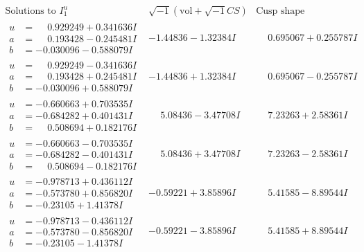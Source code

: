 \documentclass[1p]{elsarticle_modified}
\theoremstyle{definition}
\newcommand{\I}{\sqrt{-1}}
\begin{document}
$$\begin{array}{c|c|c}  
\text{Solutions to }I^u_{1}& \I (\text{vol} + \sqrt{-1}CS) & \text{Cusp shape}\\
 \hline 
\begin{aligned}
u &= \phantom{-}0.929249 + 0.341636 I \\
a &= \phantom{-}0.193428 - 0.245481 I \\
b &= -0.030096 - 0.588079 I\end{aligned}
 & -1.44836 - 1.32384 I & \phantom{-}0.695067 + 0.255787 I \\ \hline\begin{aligned}
u &= \phantom{-}0.929249 - 0.341636 I \\
a &= \phantom{-}0.193428 + 0.245481 I \\
b &= -0.030096 + 0.588079 I\end{aligned}
 & -1.44836 + 1.32384 I & \phantom{-}0.695067 - 0.255787 I \\ \hline\begin{aligned}
u &= -0.660663 + 0.703535 I \\
a &= -0.684282 + 0.401431 I \\
b &= \phantom{-}0.508694 + 0.182176 I\end{aligned}
 & \phantom{-}5.08436 - 3.47708 I & \phantom{-}7.23263 + 2.58361 I \\ \hline\begin{aligned}
u &= -0.660663 - 0.703535 I \\
a &= -0.684282 - 0.401431 I \\
b &= \phantom{-}0.508694 - 0.182176 I\end{aligned}
 & \phantom{-}5.08436 + 3.47708 I & \phantom{-}7.23263 - 2.58361 I \\ \hline\begin{aligned}
u &= -0.978713 + 0.436112 I \\
a &= -0.573780 + 0.856820 I \\
b &= -0.23105 + 1.41378 I\end{aligned}
 & -0.59221 + 3.85896 I & \phantom{-}5.41585 - 8.89544 I \\ \hline\begin{aligned}
u &= -0.978713 - 0.436112 I \\
a &= -0.573780 - 0.856820 I \\
b &= -0.23105 - 1.41378 I\end{aligned}
 & -0.59221 - 3.85896 I & \phantom{-}5.41585 + 8.89544 I \\ \hline\begin{aligned}

\end{aligned}
\end{array}$$
\end{document}
